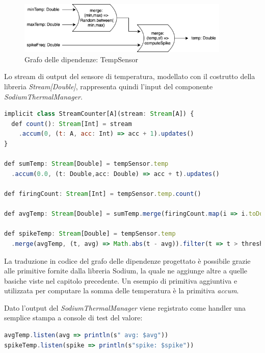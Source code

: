 \documentclass[../main.tex]{subfiles}
\begin{document}
\begin{figure}[H]
    \centering
    \includegraphics[width=0.9\textwidth]{img/frp-scala-Page-7.drawio.png}
    \caption{Grafo delle dipendenze: TempSensor}
\end{figure}

Lo stream di output del sensore di temperatura, modellato con il costrutto della libreria \textit{Stream[Double]}, rappresenta quindi l'input del componente \textit{SodiumThermalManager}. 

\begin{lstlisting}[language=Javascript, caption=Sodium - Traduzione della parte di grafo delle dipendenze riguardante la temperatura media e gli spike in codice]
implicit class StreamCounter[A](stream: Stream[A]) {
  def count(): Stream[Int] = stream
    .accum(0, (t: A, acc: Int) => acc + 1).updates()
}
  
def sumTemp: Stream[Double] = tempSensor.temp
  .accum(0.0, (t: Double,acc: Double) => acc + t).updates()
    
def firingCount: Stream[Int] = tempSensor.temp.count()

def avgTemp: Stream[Double] = sumTemp.merge(firingCount.map(i => i.toDouble), (s,f) => s / f)

def spikeTemp: Stream[Double] = tempSensor.temp
  .merge(avgTemp, (t, avg) => Math.abs(t - avg)).filter(t => t > thresholdTemp.sample())
\end{lstlisting}

La traduzione in codice del grafo delle dipendenze progettato è possibile grazie alle primitive fornite dalla libreria Sodium, la quale ne aggiunge altre a quelle basiche viste nel capitolo precedente. Un esempio di primitiva aggiuntiva e utilizzata per computare la somma delle temperatura è la primitiva \textit{accum}.

Dato l'output del \textit{SodiumThermalManager} viene registrato come handler una semplice stampa a console di test del valore:
\begin{lstlisting}[language=Javascript, caption=Sodium - Registrazione listeners]
avgTemp.listen(avg => println(s" avg: $avg"))
spikeTemp.listen(spike => println(s"spike: $spike"))
\end{lstlisting}
\end{document}
